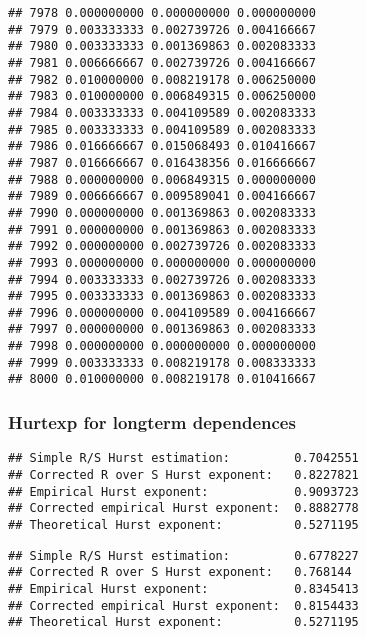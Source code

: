 \documentclass[
]{article}
\newenvironment{Shaded}{\begin{snugshade}}{\end{snugshade}}
\newcommand{\FunctionTok}[1]{\textcolor[rgb]{0.13,0.29,0.53}{\textbf{#1}}}
\newcommand{\NormalTok}[1]{#1}
\newcommand{\SpecialCharTok}[1]{\textcolor[rgb]{0.81,0.36,0.00}{\textbf{#1}}}
\begin{document}
\begin{verbatim}
## 7978 0.000000000 0.000000000 0.000000000
## 7979 0.003333333 0.002739726 0.004166667
## 7980 0.003333333 0.001369863 0.002083333
## 7981 0.006666667 0.002739726 0.004166667
## 7982 0.010000000 0.008219178 0.006250000
## 7983 0.010000000 0.006849315 0.006250000
## 7984 0.003333333 0.004109589 0.002083333
## 7985 0.003333333 0.004109589 0.002083333
## 7986 0.016666667 0.015068493 0.010416667
## 7987 0.016666667 0.016438356 0.016666667
## 7988 0.000000000 0.006849315 0.000000000
## 7989 0.006666667 0.009589041 0.004166667
## 7990 0.000000000 0.001369863 0.002083333
## 7991 0.000000000 0.001369863 0.002083333
## 7992 0.000000000 0.002739726 0.002083333
## 7993 0.000000000 0.000000000 0.000000000
## 7994 0.003333333 0.002739726 0.002083333
## 7995 0.003333333 0.001369863 0.002083333
## 7996 0.000000000 0.004109589 0.004166667
## 7997 0.000000000 0.001369863 0.002083333
## 7998 0.000000000 0.000000000 0.000000000
## 7999 0.003333333 0.008219178 0.008333333
## 8000 0.010000000 0.008219178 0.010416667
\end{verbatim}

\hypertarget{hurtexp-for-longterm-dependences}{%
\subsubsection{Hurtexp for longterm
dependences}\label{hurtexp-for-longterm-dependences}}

\begin{Shaded}
\end{Shaded}

\begin{verbatim}
## Simple R/S Hurst estimation:         0.7042551 
## Corrected R over S Hurst exponent:   0.8227821 
## Empirical Hurst exponent:            0.9093723 
## Corrected empirical Hurst exponent:  0.8882778 
## Theoretical Hurst exponent:          0.5271195
\end{verbatim}

\begin{Shaded}
\end{Shaded}

\begin{verbatim}
## Simple R/S Hurst estimation:         0.6778227 
## Corrected R over S Hurst exponent:   0.768144 
## Empirical Hurst exponent:            0.8345413 
## Corrected empirical Hurst exponent:  0.8154433 
## Theoretical Hurst exponent:          0.5271195
\end{verbatim}
\end{document}

